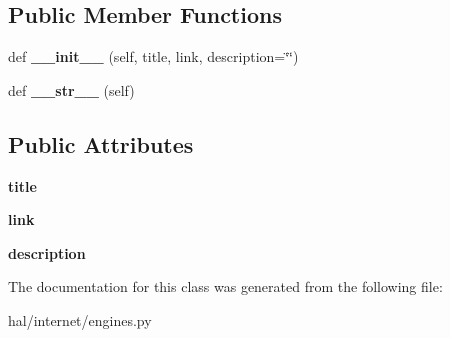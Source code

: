 \subsection*{Public Member Functions}
\begin{DoxyCompactItemize}
\item 
def {\bfseries \+\_\+\+\_\+init\+\_\+\+\_\+} (self, title, link, description=\char`\"{}\char`\"{})\hypertarget{classhal_1_1internet_1_1engines_1_1_search_engine_result_aafeb2e635cb5a9b381d5535c714d11c2}{}\label{classhal_1_1internet_1_1engines_1_1_search_engine_result_aafeb2e635cb5a9b381d5535c714d11c2}

\item 
def {\bfseries \+\_\+\+\_\+str\+\_\+\+\_\+} (self)\hypertarget{classhal_1_1internet_1_1engines_1_1_search_engine_result_aa65111d2c02c5e1d9d2b135d60eaeeac}{}\label{classhal_1_1internet_1_1engines_1_1_search_engine_result_aa65111d2c02c5e1d9d2b135d60eaeeac}

\end{DoxyCompactItemize}
\subsection*{Public Attributes}
\begin{DoxyCompactItemize}
\item 
{\bfseries title}\hypertarget{classhal_1_1internet_1_1engines_1_1_search_engine_result_ad5bf472925c771cddddc1ec8008cc6b2}{}\label{classhal_1_1internet_1_1engines_1_1_search_engine_result_ad5bf472925c771cddddc1ec8008cc6b2}

\item 
{\bfseries link}\hypertarget{classhal_1_1internet_1_1engines_1_1_search_engine_result_a87fd88d4579dd7be2fed559386cc58e8}{}\label{classhal_1_1internet_1_1engines_1_1_search_engine_result_a87fd88d4579dd7be2fed559386cc58e8}

\item 
{\bfseries description}\hypertarget{classhal_1_1internet_1_1engines_1_1_search_engine_result_a055578b70da89ea3248abb6aa27d92df}{}\label{classhal_1_1internet_1_1engines_1_1_search_engine_result_a055578b70da89ea3248abb6aa27d92df}

\end{DoxyCompactItemize}


The documentation for this class was generated from the following file\+:\begin{DoxyCompactItemize}
\item 
hal/internet/engines.\+py\end{DoxyCompactItemize}
